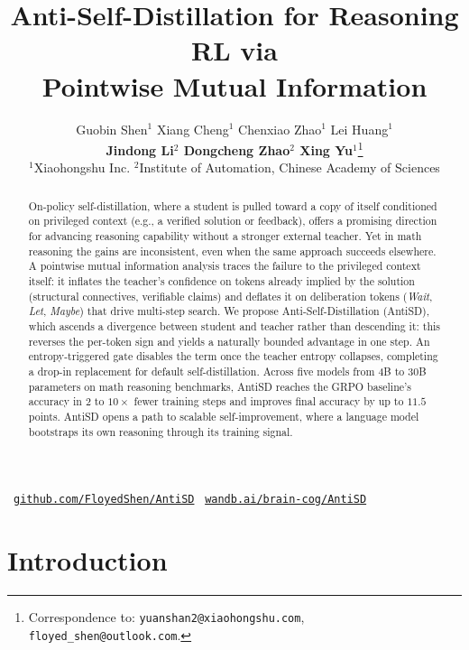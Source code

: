\documentclass{article}
\title{Anti-Self-Distillation for Reasoning RL via\\ Pointwise Mutual Information}
\author{%
  Guobin Shen$^{1}$  \quad Xiang Cheng$^{1}$ \quad Chenxiao Zhao$^{1}$ \quad Lei Huang$^{1}$\\[2pt]
  \textbf{Jindong Li$^{2}$ \quad Dongcheng Zhao$^{2}$ \quad Xing Yu$^{1}$}\thanks{Correspondence to: \texttt{yuanshan2@xiaohongshu.com}, \texttt{floyed\_shen@outlook.com}.} \\[4pt]
  $^{1}$Xiaohongshu Inc. \quad $^{2}$Institute of Automation, Chinese Academy of Sciences
}
\newcommand{\resourcelink}[3]{%
  #1~\texttt{\href{#3}{#2}}%
}
\begin{document}
\maketitle

\begin{abstract}
  On-policy self-distillation, where a student is pulled toward a copy of itself conditioned on privileged context (e.g., a verified solution or feedback), offers a promising direction for advancing reasoning capability without a stronger external teacher.
  Yet in math reasoning the gains are inconsistent, even when the same approach succeeds elsewhere.
  A pointwise mutual information analysis traces the failure to the privileged context itself: it inflates the teacher's confidence on tokens already implied by the solution (structural connectives, verifiable claims) and deflates it on deliberation tokens (\emph{Wait}, \emph{Let}, \emph{Maybe}) that drive multi-step search.
  We propose Anti-Self-Distillation (AntiSD), which ascends a divergence between student and teacher rather than descending it: this reverses the per-token sign and yields a naturally bounded advantage in one step.
  An entropy-triggered gate disables the term once the teacher entropy collapses, completing a drop-in replacement for default self-distillation.
  Across five models from 4B to 30B parameters on math reasoning benchmarks, AntiSD reaches the GRPO baseline's accuracy in $2$ to $10\times$ fewer training steps and improves final accuracy by up to $11.5$ points.
  AntiSD opens a path to scalable self-improvement, where a language model bootstraps its own reasoning through its training signal.
\end{abstract}

\begin{center}\vspace{-0.6em}\small
  \resourcelink{\faGithub}{github.com/FloyedShen/AntiSD}{https://github.com/FloyedShen/AntiSD}%
  \hspace{2em}%
  \resourcelink{\faChartLine}{wandb.ai/brain-cog/AntiSD}{https://wandb.ai/brain-cog/AntiSD}
\end{center}

\section{Introduction}
\label{sec:intro}
\vspace{-0.5em}
\end{document}
